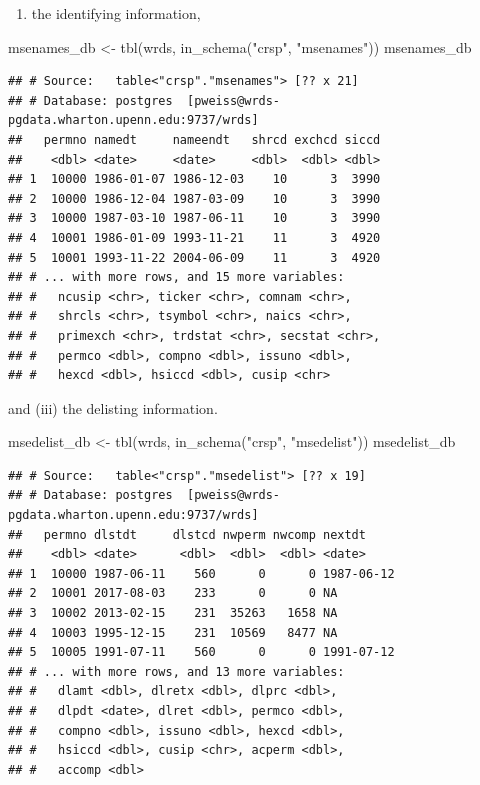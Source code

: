 \documentclass[
]{krantz}
\newenvironment{Shaded}{\begin{snugshade}}{\end{snugshade}}
\newcommand{\FunctionTok}[1]{\textcolor[rgb]{0,0,0}{#1}}
\newcommand{\NormalTok}[1]{#1}
\newcommand{\OtherTok}[1]{\textcolor[rgb]{0.37,0.37,0.37}{#1}}
\newcommand{\StringTok}[1]{\textcolor[rgb]{0.5,0.5,0.5}{#1}}
\providecommand{\tightlist}{%
  \setlength{\itemsep}{0pt}\setlength{\parskip}{0pt}}
\begin{document}
\begin{enumerate}
\def\labelenumi{(\roman{enumi})}
\setcounter{enumi}{1}
\tightlist
\item
  the identifying information,
\end{enumerate}

\begin{Shaded}
\begin{Highlighting}[]
\NormalTok{msenames\_db }\OtherTok{\textless{}{-}} \FunctionTok{tbl}\NormalTok{(wrds, }\FunctionTok{in\_schema}\NormalTok{(}\StringTok{"crsp"}\NormalTok{, }\StringTok{"msenames"}\NormalTok{))}
\NormalTok{msenames\_db}
\end{Highlighting}
\end{Shaded}

\begin{verbatim}
## # Source:   table<"crsp"."msenames"> [?? x 21]
## # Database: postgres  [pweiss@wrds-pgdata.wharton.upenn.edu:9737/wrds]
##   permno namedt     nameendt   shrcd exchcd siccd
##    <dbl> <date>     <date>     <dbl>  <dbl> <dbl>
## 1  10000 1986-01-07 1986-12-03    10      3  3990
## 2  10000 1986-12-04 1987-03-09    10      3  3990
## 3  10000 1987-03-10 1987-06-11    10      3  3990
## 4  10001 1986-01-09 1993-11-21    11      3  4920
## 5  10001 1993-11-22 2004-06-09    11      3  4920
## # ... with more rows, and 15 more variables:
## #   ncusip <chr>, ticker <chr>, comnam <chr>,
## #   shrcls <chr>, tsymbol <chr>, naics <chr>,
## #   primexch <chr>, trdstat <chr>, secstat <chr>,
## #   permco <dbl>, compno <dbl>, issuno <dbl>,
## #   hexcd <dbl>, hsiccd <dbl>, cusip <chr>
\end{verbatim}

and (iii) the delisting information.

\begin{Shaded}
\begin{Highlighting}[]
\NormalTok{msedelist\_db }\OtherTok{\textless{}{-}} \FunctionTok{tbl}\NormalTok{(wrds, }\FunctionTok{in\_schema}\NormalTok{(}\StringTok{"crsp"}\NormalTok{, }\StringTok{"msedelist"}\NormalTok{))}
\NormalTok{msedelist\_db}
\end{Highlighting}
\end{Shaded}

\begin{verbatim}
## # Source:   table<"crsp"."msedelist"> [?? x 19]
## # Database: postgres  [pweiss@wrds-pgdata.wharton.upenn.edu:9737/wrds]
##   permno dlstdt     dlstcd nwperm nwcomp nextdt    
##    <dbl> <date>      <dbl>  <dbl>  <dbl> <date>    
## 1  10000 1987-06-11    560      0      0 1987-06-12
## 2  10001 2017-08-03    233      0      0 NA        
## 3  10002 2013-02-15    231  35263   1658 NA        
## 4  10003 1995-12-15    231  10569   8477 NA        
## 5  10005 1991-07-11    560      0      0 1991-07-12
## # ... with more rows, and 13 more variables:
## #   dlamt <dbl>, dlretx <dbl>, dlprc <dbl>,
## #   dlpdt <date>, dlret <dbl>, permco <dbl>,
## #   compno <dbl>, issuno <dbl>, hexcd <dbl>,
## #   hsiccd <dbl>, cusip <chr>, acperm <dbl>,
## #   accomp <dbl>
\end{verbatim}
\end{document}
